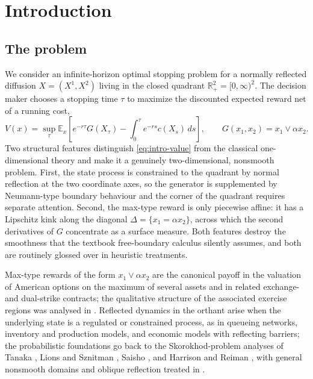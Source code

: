 \documentclass[pdflatex,sn-mathphys-num]{sn-jnl}
\theoremstyle{plain}
\theoremstyle{definition}
\newcommand{\R}{\mathbb{R}}
\begin{document}
\section{Introduction}
\label{sec:introduction}

\subsection{The problem}
\label{sec:intro-problem}
We consider an infinite-horizon optimal stopping problem for a normally
reflected diffusion $X=(X^1,X^2)$ living in the closed quadrant
$\R^2_+=[0,\infty)^2$. The decision maker chooses a stopping time $\tau$ to
maximize the discounted expected reward net of a running cost,
\begin{equation}
\label{eq:intro-value}
   V(x)
   =
   \sup_{\tau}
   \mathbb E_x\left[
      e^{-r\tau}G(X_\tau)
      -\int_0^\tau e^{-rs}c(X_s)\,ds
   \right],
   \qquad
   G(x_1,x_2)=x_1\vee\alpha x_2 .
\end{equation}
Two structural features distinguish \eqref{eq:intro-value} from the classical
one-dimensional theory and make it a genuinely two-dimensional, nonsmooth
problem. First, the state process is constrained to the quadrant by normal
reflection at the two coordinate axes, so the generator is supplemented by
Neumann-type boundary behaviour and the corner of the quadrant requires
separate attention. Second, the max-type reward is only piecewise affine: it
has a Lipschitz kink along the diagonal $\Delta=\{x_1=\alpha x_2\}$, across
which the second derivatives of $G$ concentrate as a surface measure. Both
features destroy the smoothness that the textbook free-boundary calculus
silently assumes, and both are routinely glossed over in heuristic
treatments.

Max-type rewards of the form $x_1\vee\alpha x_2$ are the canonical payoff in
the valuation of American options on the maximum of several assets and in
related exchange- and dual-strike contracts; the qualitative structure of the
associated exercise regions was analysed in \cite{broadie1997valuation,villeneuve1999exercise,bayer2020pricing,battauz2015real,dai2005american,detemple2014optimal,soner2025stopping,wang2025analysis,whitehead2012bias}. Reflected
dynamics in the orthant arise when the underlying state is a regulated or
constrained process, as in queueing networks, inventory and production models,
and economic models with reflecting barriers; the probabilistic foundations
go back to the Skorokhod-problem analyses of Tanaka \cite{tanaka1979stochastic}, Lions
and Sznitman \cite{lions1984stochastic}, Saisho \cite{saisho1987stochastic}, and Harrison
and Reiman \cite{harrison1981reflected}, with general nonsmooth domains and
oblique reflection treated in \cite{dupuis1993sdes,hino2021pathwise,lundstrom2019stochastic,wang2025analysis1,li2026wong,lipshutz2018directional,deblassie1996brownian,duan2019white,leimkuhler2023simplest,cai2026optimal}.
\end{document}
